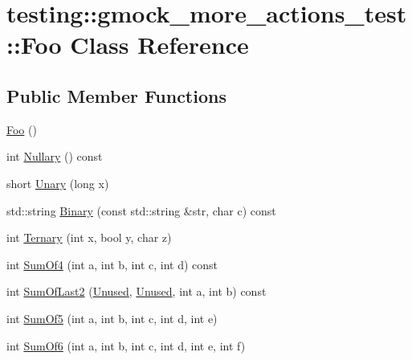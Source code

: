 \hypertarget{classtesting_1_1gmock__more__actions__test_1_1Foo}{}\section{testing\+::gmock\+\_\+more\+\_\+actions\+\_\+test\+::Foo Class Reference}
\label{classtesting_1_1gmock__more__actions__test_1_1Foo}
\subsection*{Public Member Functions}
\begin{DoxyCompactItemize}
\item 
\mbox{\hyperlink{classtesting_1_1gmock__more__actions__test_1_1Foo_ad2603a65b94e019c75f4227787b9177e}{Foo}} ()
\item 
int \mbox{\hyperlink{classtesting_1_1gmock__more__actions__test_1_1Foo_ad6ba38dbb9b1594ac178630f07c4baa5}{Nullary}} () const
\item 
short \mbox{\hyperlink{classtesting_1_1gmock__more__actions__test_1_1Foo_a68d2b46d6cc7d51979b0254940af6090}{Unary}} (long x)
\item 
std\+::string \mbox{\hyperlink{classtesting_1_1gmock__more__actions__test_1_1Foo_a8ee56742c6c025af680617464c71ecef}{Binary}} (const std\+::string \&str, char c) const
\item 
int \mbox{\hyperlink{classtesting_1_1gmock__more__actions__test_1_1Foo_afc5b86988210ad598fa3a2a9822297e4}{Ternary}} (int x, bool y, char z)
\item 
int \mbox{\hyperlink{classtesting_1_1gmock__more__actions__test_1_1Foo_a69ca68e84528904032bad9533a23fb0a}{Sum\+Of4}} (int a, int b, int c, int d) const
\item 
int \mbox{\hyperlink{classtesting_1_1gmock__more__actions__test_1_1Foo_abc041eb7a8e8211656495f2540f315ec}{Sum\+Of\+Last2}} (\mbox{\hyperlink{namespacetesting_a603e329ec0263ebfcf16f712810bd511}{Unused}}, \mbox{\hyperlink{namespacetesting_a603e329ec0263ebfcf16f712810bd511}{Unused}}, int a, int b) const
\item 
int \mbox{\hyperlink{classtesting_1_1gmock__more__actions__test_1_1Foo_a55fb0cdc224c450f401e0fea4f979512}{Sum\+Of5}} (int a, int b, int c, int d, int e)
\item 
int \mbox{\hyperlink{classtesting_1_1gmock__more__actions__test_1_1Foo_a34b5ae7cd4620331af92c637e3534bc4}{Sum\+Of6}} (int a, int b, int c, int d, int e, int f)
\item 

\end{DoxyCompactItemize}
